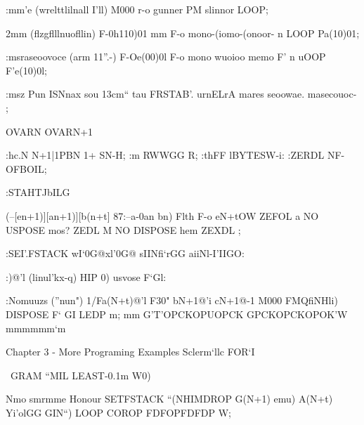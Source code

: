  

:mm'e (wrelttlilnall I'll)
M000 r-o gunner PM slinnor LOOP;

2mm (ﬂzgﬂllnuoﬂlin)
F-0h110)01 mm
F-o mono-(iomo-(onoor- n LOOP
Pa(10)01;

:msraseoovoce (arm 11”.-)
F-Oe(00)0l F-o
mono wuoioo memo F' n uOOP
F'e(10)0l;

:msz Pun ISNnax sou 13cm“ tau
FRSTAB'. urnELrA mares seoowae.
masecouoc- ;

OVARN OVARN+1

:hc.N N+1|1PBN 1+ SN-H;
:m RWWGG R;
:thFF lBYTESW-i:
:ZERDL NF-OFBOIL;

:STAHTJbILG

(--[e{n+1)][a{n+1)][b(n+t}] 87:--a-0a{n} b{n})
Flth F-o e{N+tO}W ZEFOL
a{ NO} USPOSE mos? ZEDL
M NO} DISPOSE hem ZEXDL ;

:SEI’.FSTACK w{I‘0}G@x{l'0}G@ sIINfi‘rGG
aiiNl-I'IIGO:

:)@'l (linul'kx-q) HIP 0) usvose F‘Gl:

:Nomuuzs (”nun")
1/Fa(N+t)@'l F30"
b{N+1}@'i c{N+1}@-1
M000 FMQﬁNHli) DISPOSE F‘ GI LEDP
m;
mm G'T'OPCKOPUOPCK
GPCKOPCKOPOK'W
mmmmmm‘m

Chapter 3 - More Programing Examples Sclerm‘llc FOR‘I

\ GRAM “MIL LEAST-0.1m W0)

Nmo smrmme
Honour SETFSTACK
“(NHIMDROP G(N+1) emu) A(N+t)
Yi'olGG GIN“)
LOOP COROP FDFOPFDFDP W;

